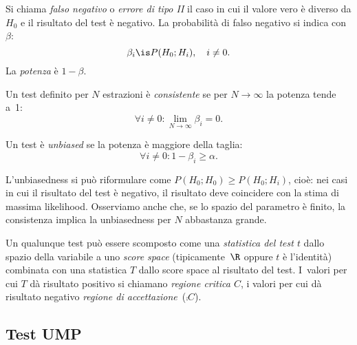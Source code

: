 \begin{definition}
	Si chiama \emph{falso negativo} o \emph{errore di tipo II}
	il caso in cui il valore vero è diverso da $H_0$ e il risultato del test è negativo.
	La probabilità di falso negativo si indica con $\beta$:
	\begin{equation*}
		\beta_i
		\is P(H_0;H_i), \quad i \neq 0.
	\end{equation*}
	La \emph{potenza} è $1-\beta$.
\end{definition}

\begin{definition}[Consistenza]
	Un test definito per $N$ estrazioni è \emph{consistente}
	se per $N\to\infty$ la potenza tende a~1:
	\begin{equation*}
		\forall i\neq0:
		\lim_{N\to\infty} \beta_i = 0.
	\end{equation*}
\end{definition}

\begin{definition}[Unbiasedness]
	Un test è \emph{unbiased}
	se la potenza è maggiore della taglia:
	\begin{equation*}
		\forall i\neq0:
		1-\beta_i \ge \alpha.
	\end{equation*}
\end{definition}

L'unbiasedness si può riformulare come $P(H_0;H_0)\ge P(H_0;H_i)$,
cioè: nei casi in cui il risultato del test è negativo,
il risultato deve coincidere con la stima di massima likelihood.
Osserviamo anche che,
se lo spazio del parametro è finito,
la consistenza implica la unbiasedness per $N$ abbastanza grande.

\begin{definition}	
	Un qualunque test può essere scomposto come una \emph{statistica del test $t$}
	dallo spazio della variabile a uno \emph{score space} (tipicamente~$\R$ oppure $t$ è l'identità)
	combinata con una statistica $T$ dallo score space al risultato del test.
	I~valori per cui $T$ dà risultato positivo si chiamano \emph{regione critica $C$},
	i valori per cui dà risultato negativo \emph{regione di accettazione}~($\comp C$).
\end{definition}

\subsection{Test UMP}


